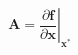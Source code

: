 \begin{equation}
	\boldsymbol A = \left.\dfrac{\partial \boldsymbol f}{\partial \boldsymbol x}\right\vert_{\boldsymbol{x^*}}
\end{equation}
